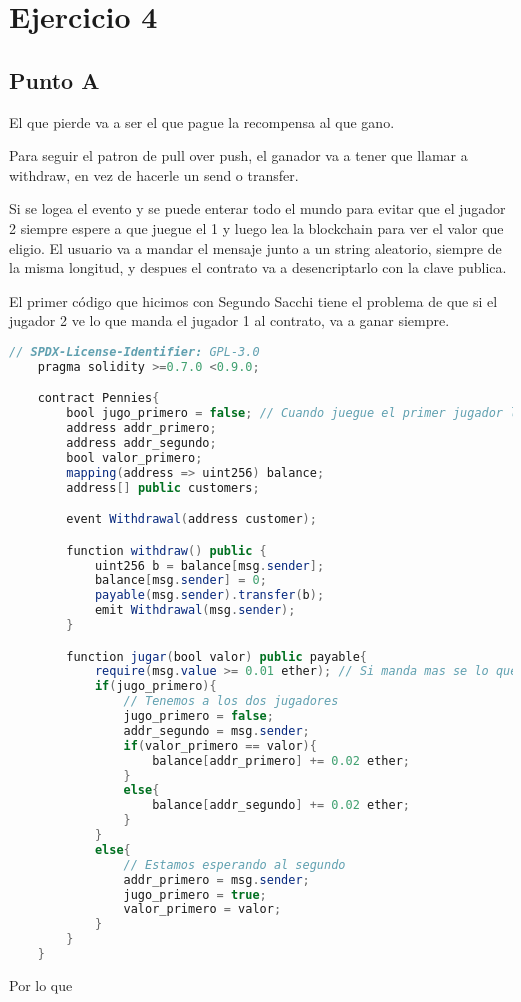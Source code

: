 \documentclass[12pt]{article}
\begin{document}
\section*{Ejercicio 4}
\subsection*{Punto A}
El que pierde va a ser el que pague la recompensa al que gano. 

Para seguir el patron de pull over push, el ganador va a tener que llamar a withdraw, en vez de hacerle un send o transfer. 

Si se logea el evento y se puede enterar todo el mundo para evitar que el jugador 2 siempre espere a que juegue el 1 y luego lea la blockchain para ver el valor que eligio. El usuario va a mandar el mensaje junto a un string aleatorio, siempre de la misma longitud, y despues el contrato va a desencriptarlo con la clave publica. 

El primer código que hicimos con Segundo Sacchi tiene el problema de que si el jugador 2 ve lo que manda el jugador 1 al contrato, va a ganar siempre.  

\begin{lstlisting}[language=Java]
    // SPDX-License-Identifier: GPL-3.0
    pragma solidity >=0.7.0 <0.9.0;

    contract Pennies{
        bool jugo_primero = false; // Cuando juegue el primer jugador lo pongo en True, cuando juegue el segundo lo pongo en False 
        address addr_primero;
        address addr_segundo; 
        bool valor_primero;
        mapping(address => uint256) balance; 
        address[] public customers;

        event Withdrawal(address customer);

        function withdraw() public {
            uint256 b = balance[msg.sender];
            balance[msg.sender] = 0;
            payable(msg.sender).transfer(b);
            emit Withdrawal(msg.sender);
        }

        function jugar(bool valor) public payable{
            require(msg.value >= 0.01 ether); // Si manda mas se lo queda la casa como donacion
            if(jugo_primero){
                // Tenemos a los dos jugadores
                jugo_primero = false; 
                addr_segundo = msg.sender; 
                if(valor_primero == valor){
                    balance[addr_primero] += 0.02 ether;  
                }
                else{
                    balance[addr_segundo] += 0.02 ether;
                }
            }
            else{
                // Estamos esperando al segundo 
                addr_primero = msg.sender;
                jugo_primero = true;
                valor_primero = valor;
            }
        }
    }
\end{lstlisting}

Por lo que 
\end{document}
